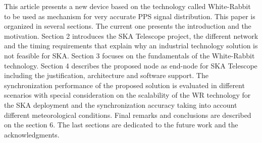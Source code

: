 This article presents a new device based on the technology called White-Rabbit 
\cite{ohwr:wr_wiki} to be used as mechanism for very accurate PPS signal 
distribution. This paper is organized in several sections. The current one 
presents the introduction and the motivation. Section 2 introduces the SKA 
Telescope project, the different network and the timing requirements that 
explain why an industrial technology solution is not feasible for SKA. Section 
3 focuses on the fundamentals of the White-Rabbit technology. Section 4 
describes the proposed node as end-node for SKA Telescope including the 
justification, architecture and software support. The synchronization 
performance of the proposed solution is evaluated in different scenarios with 
special consideration on the scalability of the WR technology for the SKA 
deployment and the synchronization accuracy taking into account different 
meteorological conditions. Final remarks and conclusions are described on the 
section 6. The last sections are dedicated to the future work and the 
acknowledgments.